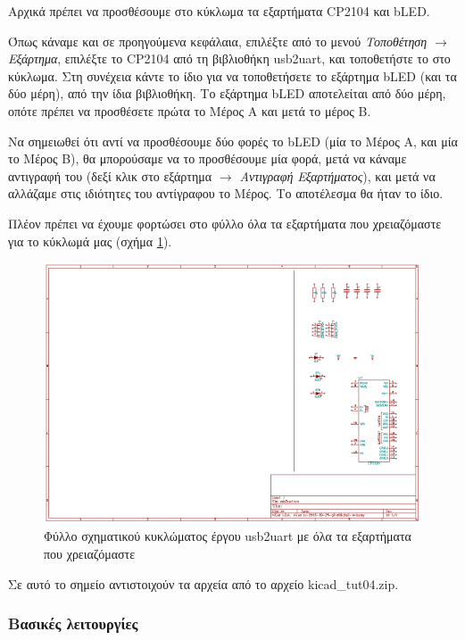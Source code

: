 \documentclass[a4paper]{article}
\begin{document}
Αρχικά πρέπει να προσθέσουμε στο κύκλωμα τα εξαρτήματα CP2104 και bLED. 

Όπως κάναμε και σε προηγούμενα κεφάλαια, επιλέξτε από το μενού \textit{Τοποθέτηση $\rightarrow$ Εξάρτημα}, επιλέξτε το CP2104 από τη βιβλιοθήκη usb2uart, και τοποθετήστε το στο κύκλωμα. Στη συνέχεια κάντε το ίδιο για να τοποθετήσετε το εξάρτημα bLED (και τα δύο μέρη), από την ίδια βιβλιοθήκη. Το εξάρτημα bLED αποτελείται από δύο μέρη, οπότε πρέπει να προσθέσετε πρώτα το Μέρος Α και μετά το μέρος Β.

Να σημειωθεί ότι αντί να προσθέσουμε δύο φορές το bLED (μία το Μέρος Α, και μία το Μέρος Β), θα μπορούσαμε να το προσθέσουμε μία φορά, μετά να κάναμε αντιγραφή του (δεξί κλικ στο εξάρτημα \textit{$\rightarrow$ Αντιγραφή Εξαρτήματος}), και μετά να αλλάζαμε στις ιδιότητες του αντίγραφου το Μέρος. Το αποτέλεσμα θα ήταν το ίδιο.

Πλέον πρέπει να έχουμε φορτώσει στο φύλλο όλα τα εξαρτήματα που χρειαζόμαστε για το κύκλωμά μας (σχήμα \ref{fig:eesch-circ-allcomp}).

\begin{figure}
  \begin{center}
    \includegraphics[width=.9\textwidth]{img/eesch-circ-allcomp.png}
    \caption{Φύλλο σχηματικού κυκλώματος έργου usb2uart με όλα τα εξαρτήματα που χρειαζόμαστε}
    \label{fig:eesch-circ-allcomp}
  \end{center}
\end{figure}

Σε αυτό το σημείο αντιστοιχούν τα αρχεία από το αρχείο kicad\_tut04.zip.

\subsubsection{Βασικές λειτουργίες}
\end{document}
